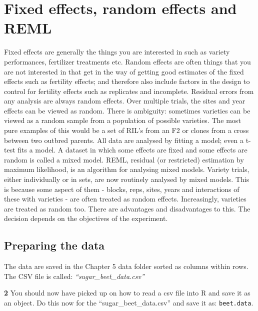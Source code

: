 \documentclass[
]{book}
\makeatletter
\newenvironment{kframe}{%
\medskip{}
\setlength{\fboxsep}{.8em}
 \def\at@end@of@kframe{}%
 \ifinner\ifhmode%
  \def\at@end@of@kframe{\end{minipage}}%
  \begin{minipage}{\columnwidth}%
 \fi\fi%
 \def\FrameCommand##1{\hskip\@totalleftmargin \hskip-\fboxsep
 \colorbox{shadecolor}{##1}\hskip-\fboxsep
     \hskip-\linewidth \hskip-\@totalleftmargin \hskip\columnwidth}%
 \MakeFramed {\advance\hsize-\width
   \@totalleftmargin\z@ \linewidth\hsize
   \@setminipage}}%
 {\par\unskip\endMakeFramed%
 \at@end@of@kframe}
\newenvironment{rmdblock}[1]
  {
  \begin{itemize}
  \renewcommand{\labelitemi}{
    \raisebox{-.7\height}[0pt][0pt]{
      {\setkeys{Gin}{width=3em,keepaspectratio}\texttt{[image: images/\#1]}}
    }
  }
  \setlength{\fboxsep}{1em}
  \begin{kframe}
  \item
  }
  {
  \end{kframe}
  \end{itemize}
  }
\newenvironment{rmdquiz}
  {\begin{rmdblock}{quiz}}
  {\end{rmdblock}}
\makeatother
\begin{document}
\hypertarget{fixed-effects-random-effects-and-reml}{%
\section{Fixed effects, random effects and REML}\label{fixed-effects-random-effects-and-reml}}

Fixed effects are generally the things you are interested in such as variety performances, fertilizer treatments etc. Random effects are often things that you are not interested in that get in the way of getting good estimates of the fixed effects such as fertility effects; and therefore also include factors in the design to control for fertility effects such as replicates and incomplete. Residual errors from any analysis are always random effects. Over multiple trials, the sites and year effects can be viewed as random. There is ambiguity: sometimes varieties can be viewed as a random sample from a population of possible varieties. The most pure examples of this would be a set of RIL's from an F2 or clones from a cross between two outbred parents. All data are analysed by fitting a model; even a t-test fits a model. A dataset in which some effects are fixed and some effects are random is called a mixed model. REML, residual (or restricted) estimation by maximum likelihood, is an algorithm for analysing mixed models. Variety trials, either individually or in sets, are now routinely analysed by mixed models. This is because some aspect of them - blocks, reps, sites, years and interactions of these with varieties - are often treated as random effects. Increasingly, varieties are treated as random too. There are advantages and disadvantages to this. The decision depends on the objectives of the experiment.

\hypertarget{preparing-the-data}{%
\subsection{Preparing the data}\label{preparing-the-data}}

The data are saved in the Chapter 5 data folder sorted as columns within rows. The CSV file is called: \emph{``sugar\_beet\_data.csv''}

\begin{rmdquiz}
\textbf{2} You should now have picked up on how to read a csv file into R and save it as an object. Do this now for the ``sugar\_beet\_data.csv'' and save it as: \texttt{beet.data}.\\
\end{rmdquiz}
\end{document}
